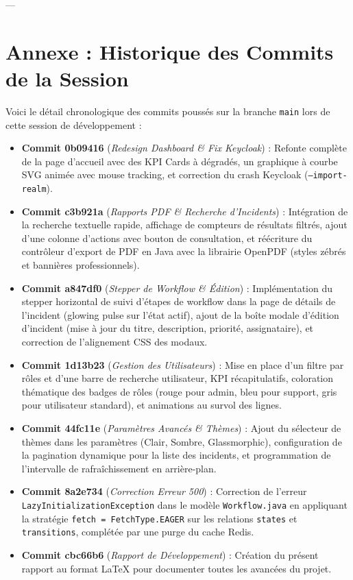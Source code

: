 \documentclass[12pt]{article}
\begin{document}
---

\section{Annexe : Historique des Commits de la Session}
Voici le détail chronologique des commits poussés sur la branche \texttt{main} lors de cette session de développement :

\begin{itemize}
    \item \textbf{Commit 0b09416} (\textit{Redesign Dashboard \& Fix Keycloak}) : Refonte complète de la page d'accueil avec des KPI Cards à dégradés, un graphique à courbe SVG animée avec mouse tracking, et correction du crash Keycloak (\texttt{--import-realm}).
    \item \textbf{Commit c3b921a} (\textit{Rapports PDF \& Recherche d'Incidents}) : Intégration de la recherche textuelle rapide, affichage de compteurs de résultats filtrés, ajout d'une colonne d'actions avec bouton de consultation, et réécriture du contrôleur d'export de PDF en Java avec la librairie OpenPDF (styles zébrés et bannières professionnels).
    \item \textbf{Commit a847df0} (\textit{Stepper de Workflow \& Édition}) : Implémentation du stepper horizontal de suivi d'étapes de workflow dans la page de détails de l'incident (glowing pulse sur l'état actif), ajout de la boîte modale d'édition d'incident (mise à jour du titre, description, priorité, assignataire), et correction de l'alignement CSS des modaux.
    \item \textbf{Commit 1d13b23} (\textit{Gestion des Utilisateurs}) : Mise en place d'un filtre par rôles et d'une barre de recherche utilisateur, KPI récapitulatifs, coloration thématique des badges de rôles (rouge pour admin, bleu pour support, gris pour utilisateur standard), et animations au survol des lignes.
    \item \textbf{Commit 44fc11e} (\textit{Paramètres Avancés \& Thèmes}) : Ajout du sélecteur de thèmes dans les paramètres (Clair, Sombre, Glassmorphic), configuration de la pagination dynamique pour la liste des incidents, et programmation de l'intervalle de rafraîchissement en arrière-plan.
    \item \textbf{Commit 8a2e734} (\textit{Correction Erreur 500}) : Correction de l'erreur \texttt{LazyInitializationException} dans le modèle \texttt{Workflow.java} en appliquant la stratégie \texttt{fetch = FetchType.EAGER} sur les relations \texttt{states} et \texttt{transitions}, complétée par une purge du cache Redis.
    \item \textbf{Commit cbc66b6} (\textit{Rapport de Développement}) : Création du présent rapport au format LaTeX pour documenter toutes les avancées du projet.
\end{itemize}
\end{document}

